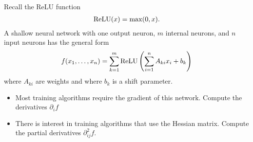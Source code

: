 \documentclass[11pt]{article}
\begin{document}


\begin{exercise}
    Recall the ReLU function 
    \begin{align}
        {\mathrm{ReLU}}(x) = \max( 0, x ).
    \end{align}
    A shallow neural network with one output neuron, $m$ internal neurons, and $n$ input neurons has the general form 
    \begin{align}
        f(x_1,\dots,x_{n}) = \sum_{k=1}^{m} {\mathrm{ReLU}}\left( \sum_{i=1}^{n} A_{ki} x_{i} + b_{k} \right)
    \end{align}
    where $A_{ki}$ are weights and where $b_{k}$ is a shift parameter. 
    \begin{itemize}
        \item Most training algorithms require the gradient of this network. Compute the derivatives $\partial_{i} f$
        \item There is interest in training algorithms that use the Hessian matrix. Compute the partial derivatives $\partial^{2}_{ij} f$.
    \end{itemize}
\end{exercise}
\end{document}
